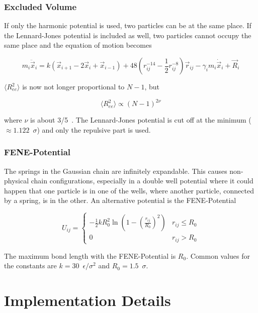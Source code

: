 \documentclass[a4paper]{article}
\begin{document}
\subsubsection{Excluded Volume}

If only the harmonic potential is used, two particles can be at the same place. If the Lennard-Jones potential is included as well, two particles cannot occupy the same place and the equation of motion becomes

\begin{equation}
m_i \ddot{\vec{x}}_i = k (\vec{x}_{i+1} - 2 \vec{x}_i + \vec{x}_{i-1}) + 48 \left( r_{ij}^{-14} - \frac{1}{2} r_{ij}^{-8} \right) \vec{r}_{ij} - \gamma_i m_i \dot{\vec{x}}_i + \vec{R}_i
\end{equation}

$\langle R_{ee}^2 \rangle$ is now not longer proportional to $N-1$, but 

\begin{equation}
\langle R_{ee}^2 \rangle \propto (N-1)^{2 \nu}
\end{equation}

where $\nu$ is about 3/5~\cite{M.Doi1988}. The Lennard-Jones potential is cut off at the minimum ($\approx 1.122 \enspace \sigma$) and only the repulsive part is used.

\subsubsection{FENE-Potential}

The springs in the Gaussian chain are infinitely expandable. This causes non-physical chain configurations, especially in a double well potential where it could happen that one particle is in one of the wells, where another particle, connected by a spring, is in the other. An alternative potential is the FENE-Potential~\cite{GaryS.Grest1986}

\begin{equation}
U_{ij} =  
\begin{cases}
-\frac{1}{2} k R^2_0 \ln \left( 1 - \left( \frac{r_{ij}}{R_0} \right)^2 \right) & r_{ij} \leq R_0 \\
0 & r_{ij} > R_0
\end{cases}
\end{equation}

The maximum bond length with the FENE-Potential is $R_0$. Common values for the constants are $k = 30 \enspace \epsilon/\sigma^2$ and $R_0 = 1.5 \enspace \sigma$.

\section{Implementation Details}
\label{sec:implementation}
\end{document}
